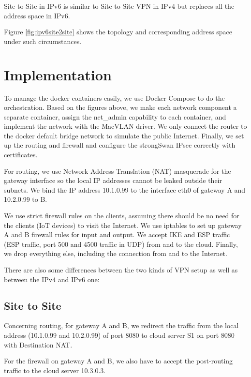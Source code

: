 \documentclass[article]{aaltoseries}
\begin{document}
Site to Site in IPv6 is similar to Site to Site VPN in IPv4 but replaces all the address space in IPv6.

Figure \ref{fig:ipv6site2site} shows the topology and corresponding address space under such circumstances.



\section{Implementation}

To manage the docker containers easily, we use Docker Compose to do the orchestration. Based on the figures above, we make each network component a separate container, assign the net\_admin capability to each container, and implement the network with the MacVLAN driver. We only connect the router to the docker default bridge network to simulate the public Internet. Finally, we set up the routing and firewall and configure the strongSwan IPsec correctly with certificates.

For routing, we use Network Address Translation (NAT) masquerade for the gateway interface so the local IP addresses cannot be leaked outside their subnets. We bind the IP address 10.1.0.99 to the interface eth0 of gateway A and 10.2.0.99 to B.

We use strict firewall rules on the clients, assuming there should be no need for the clients (IoT devices) to visit the Internet. We use iptables to set up gateway A and B firewall rules for input and output. We accept IKE and ESP traffic (ESP traffic, port 500 and 4500 traffic in UDP) from and to the cloud. Finally, we drop everything else, including the connection from and to the Internet.

There are also some differences between the two kinds of VPN setup as well as between the IPv4 and IPv6 one:

\subsection{Site to Site}

Concerning routing, for gateway A and B, we redirect the traffic from the local address (10.1.0.99 and 10.2.0.99) of port 8080 to cloud server S1 on port 8080 with Destination NAT.

For the firewall on gateway A and B, we also have to accept the post-routing traffic to the cloud server 10.3.0.3.
\end{document}
